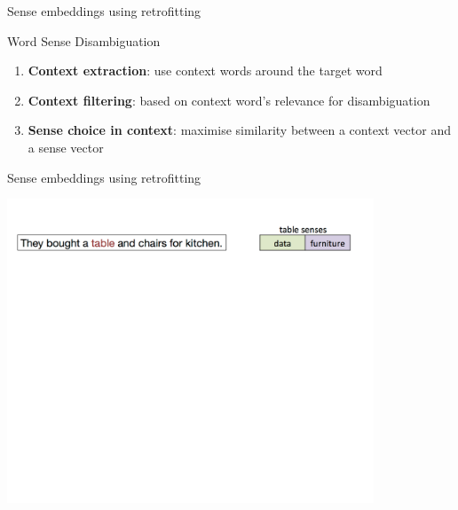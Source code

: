 \documentclass[usenames,dvipsnames]{beamer}
\begin{document}
\begin{frame}{Sense embeddings using retrofitting}
	
	\begin{block}{Word Sense Disambiguation}
	
	\begin{enumerate} 
	\item \textbf{\alert{Context extraction}}: use context words around the target word
	\item \textbf{\alert{Context filtering}}: based on context word's relevance for disambiguation
	
	\item \textbf{\alert{Sense choice in context}}: maximise similarity between a context vector and a sense vector
	
	\end{enumerate}
	\end{block}

\end{frame}


\begin{frame}{Sense embeddings using retrofitting}
\vspace{-3em}
\begin{center}
\includegraphics[width=0.82\textwidth]{wsd-1}
\end{center}	
\end{frame}
\end{document}
